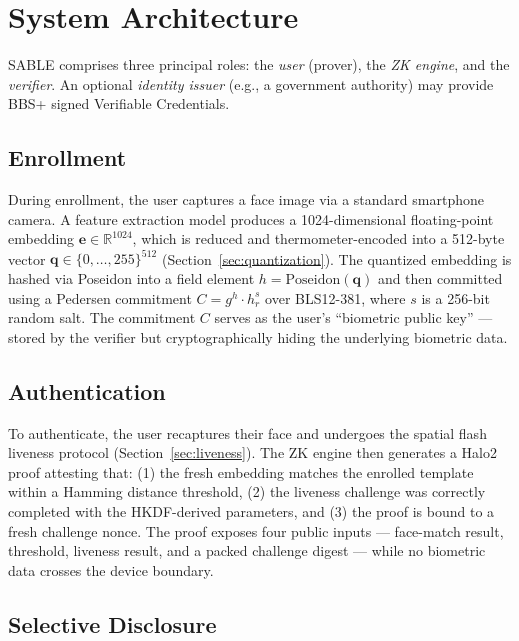 \documentclass[conference]{IEEEtran}
\begin{document}
\section{System Architecture}
\label{sec:architecture}

SABLE comprises three principal roles: the \emph{user} (prover), the \emph{ZK engine}, and the \emph{verifier}. An optional \emph{identity issuer} (e.g., a government authority) may provide BBS+ signed Verifiable Credentials.

\subsection{Enrollment}

During enrollment, the user captures a face image via a standard smartphone camera. A feature extraction model produces a 1024-dimensional floating-point embedding $\mathbf{e} \in \mathbb{R}^{1024}$, which is reduced and thermometer-encoded into a 512-byte vector $\mathbf{q} \in \{0,\ldots,255\}^{512}$ (Section~\ref{sec:quantization}). The quantized embedding is hashed via Poseidon into a field element $h = \text{Poseidon}(\mathbf{q})$ and then committed using a Pedersen commitment $C = g^h \cdot h_r^s$ over BLS12-381, where $s$ is a 256-bit random salt. The commitment $C$ serves as the user's ``biometric public key'' --- stored by the verifier but cryptographically hiding the underlying biometric data.

\subsection{Authentication}

To authenticate, the user recaptures their face and undergoes the spatial flash liveness protocol (Section~\ref{sec:liveness}). The ZK engine then generates a Halo2 proof attesting that: (1) the fresh embedding matches the enrolled template within a Hamming distance threshold, (2) the liveness challenge was correctly completed with the HKDF-derived parameters, and (3) the proof is bound to a fresh challenge nonce. The proof exposes four public inputs --- face-match result, threshold, liveness result, and a packed challenge digest --- while no biometric data crosses the device boundary.

\subsection{Selective Disclosure}
\end{document}
